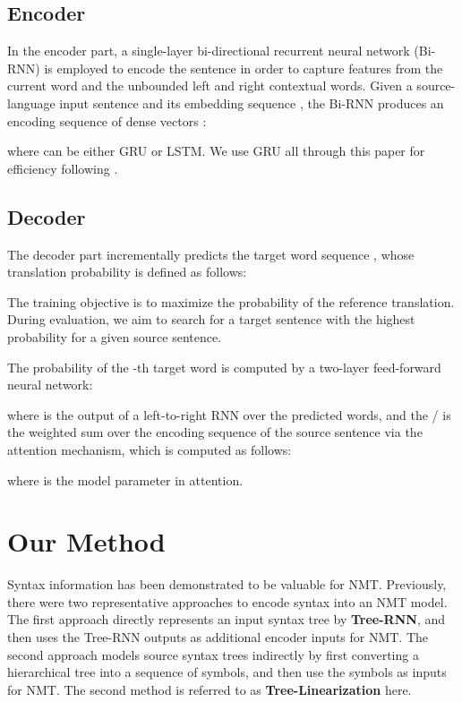 \documentclass[11pt,a4paper]{article}
\begin{document}
\begin{CJK}{UTF8}{gbsn}
\subsection{Encoder}
In the encoder part,
a single-layer bi-directional recurrent neural network (Bi-RNN) is employed to encode the sentence in order to
capture features from the current word and the unbounded left and right contextual words.
Given a source-language input sentence  and its embedding sequence ,
the Bi-RNN produces an encoding sequence of dense vectors :

where
 can be either GRU \cite{cho-EtAl:2014:EMNLP2014} or LSTM.
We use GRU all through this paper for efficiency following .

\subsection{Decoder}
The decoder part incrementally predicts the target word sequence , whose translation probability is defined as follows:

The training objective is to maximize the probability of the reference translation.
During evaluation, we aim to search for a target sentence with the highest probability for a given source sentence.

The probability of the -th target word is computed by a two-layer feed-forward neural network:

where  is the output of a left-to-right RNN  over the predicted words, and the / is the weighted sum over the encoding sequence  of the source sentence via the attention mechanism,
which is computed as follows:

where  is the model parameter in attention.


















\section{Our Method}
Syntax information has been demonstrated to be valuable for NMT.
Previously, there were two representative approaches to encode syntax into an NMT model.
The first approach directly represents an input syntax tree by \textbf{Tree-RNN},
and then uses the Tree-RNN outputs as additional encoder inputs for NMT.
The second approach models source syntax trees indirectly
by first converting a hierarchical tree into a sequence of symbols,
and then use the symbols as inputs for NMT.
The second method is referred to as \textbf{Tree-Linearization} here.


\end{CJK}
\end{document}
